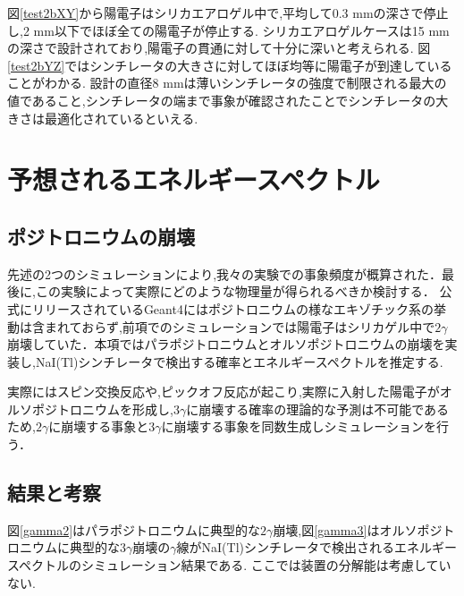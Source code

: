 図\ref{test2bXY}から陽電子はシリカエアロゲル中で,平均して0.3 mmの深さで停止し,2 mm以下でほぼ全ての陽電子が停止する.
シリカエアロゲルケースは15 mmの深さで設計されており,陽電子の貫通に対して十分に深いと考えられる.
図\ref{test2bYZ}ではシンチレータの大きさに対してほぼ均等に陽電子が到達していることがわかる.
設計の直径8 mmは薄いシンチレータの強度で制限される最大の値であること,シンチレータの端まで事象が確認されたことでシンチレータの大きさは最適化されているといえる.


\section{予想されるエネルギースペクトル}
\label{section_test3}

\subsection{ポジトロニウムの崩壊}

先述の2つのシミュレーションにより,我々の実験での事象頻度が概算された．最後に,この実験によって実際にどのような物理量が得られるべきか検討する．
公式にリリースされているGeant4にはポジトロニウムの様なエキゾチック系の挙動は含まれておらず,前項でのシミュレーションでは陽電子はシリカゲル中で$2\gamma$崩壊していた．本項ではパラポジトロニウムとオルソポジトロニウムの崩壊を実装し,NaI(Tl)シンチレータで検出する確率とエネルギースペクトルを推定する.

実際にはスピン交換反応や,ピックオフ反応が起こり,実際に入射した陽電子がオルソポジトロニウムを形成し,$3\gamma$に崩壊する確率の理論的な予測は不可能であるため,$2\gamma$に崩壊する事象と$3\gamma$に崩壊する事象を同数生成しシミュレーションを行う．

\subsection{結果と考察}

図\ref{gamma2}はパラポジトロニウムに典型的な$2\gamma$崩壊,図\ref{gamma3}はオルソポジトロニウムに典型的な$3\gamma$崩壊の$\gamma$線がNaI(Tl)シンチレータで検出されるエネルギースペクトルのシミュレーション結果である.
ここでは装置の分解能は考慮していない.

